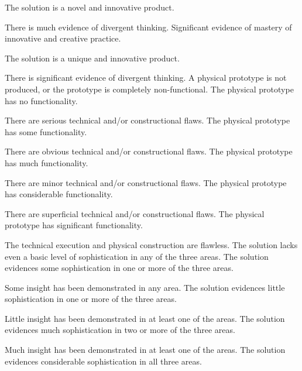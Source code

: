 \documentclass{../fal_assignment}
\begin{document}
\begin{markingrubric}
            \par The solution is a novel and innovative product.
            \par There is much evidence of divergent thinking.
        \grade Significant evidence of mastery of innovative and creative practice.
            \par The solution is a unique and innovative product.
            \par There is significant evidence of divergent thinking.
%            
        \grade\fail A physical prototype is not produced, or the prototype is completely non-functional.
        \grade The physical prototype has no functionality.
            \par There are serious technical and/or constructional flaws.
        \grade The physical prototype has some functionality.
            \par There are obvious technical and/or constructional flaws.
        \grade The physical prototype has much functionality.
            \par There are minor technical and/or constructional flaws.
        \grade The physical prototype has considerable functionality.
            \par There are superficial technical and/or constructional flaws.
        \grade The physical prototype has significant functionality.
            \par The technical execution and physical construction are flawless.
%
        \grade\fail The solution lacks even a basic level of sophistication in any of the three areas.
        \grade The solution evidences some sophistication in one or more of the three areas.
            \par Some insight has been demonstrated in any area.
        \grade The solution evidences little sophistication in one or more of the three areas.
            \par Little insight has been demonstrated in at least one of the areas.
        \grade The solution evidences much sophistication in two or more of the three areas.
            \par Much insight has been demonstrated in at least one of the areas.
        \grade The solution evidences considerable sophistication in all three areas.

\end{markingrubric}
\end{document}
